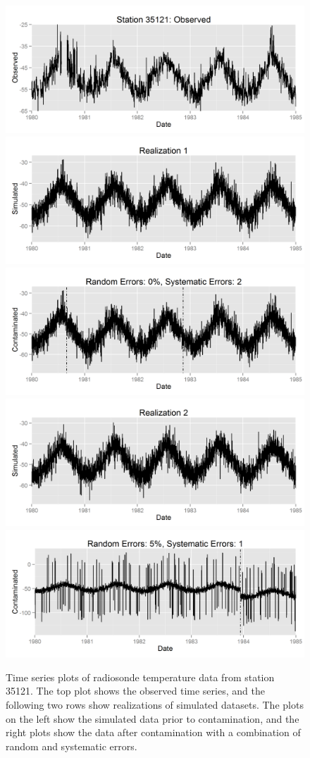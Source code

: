 \documentclass[12pt]{article}
\begin{document}
\begin{figure}
	\centering
	\includegraphics[width=.9\textwidth]{35121_time_series.png}\\
	\includegraphics[width=.45\textwidth]{35121_simulated_1.png}
	\includegraphics[width=.45\textwidth]{35121_contaminated_1.png}\\
	\includegraphics[width=.45\textwidth]{35121_simulated_2.png}
	\includegraphics[width=.45\textwidth]{35121_contaminated_2.png}\\
	\caption{Time series plots of radiosonde temperature data from station 35121.  The top plot shows the observed time series, and the following two rows show realizations of simulated datasets.  The plots on the left show the simulated data prior to contamination, and the right plots show the data after contamination with a combination of random and systematic errors.}
	\label{fig:simExample}
\end{figure}
\end{document}
